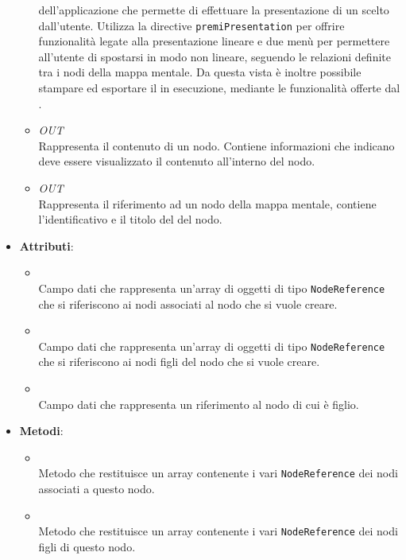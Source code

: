 \begin{itemize}
\begin{itemize}
 dell’applicazione che permette di effettuare la presentazione di un  scelto dall’utente. Utilizza la directive \texttt{premiPresentation} per offrire funzionalità legate alla presentazione lineare e due menù per permettere all'utente di spostarsi in modo non lineare, seguendo le relazioni definite tra i nodi della mappa mentale.
Da questa vista è inoltre possibile stampare ed esportare il  in esecuzione, mediante le funzionalità offerte dal .
\item \textit{OUT} \hyperref[\nogloxy{Premi::Front-End::Model::NodeContent}]{}\\
Rappresenta il contenuto di un nodo. Contiene informazioni che indicano deve essere visualizzato il contenuto all’interno del nodo.
\item \textit{OUT} \hyperref[\nogloxy{Premi::Front-End::Model::NodeReference}]{}\\
Rappresenta il riferimento ad un nodo della mappa mentale, contiene l'identificativo e il titolo del del nodo.
\end{itemize}
\item \textbf{Attributi}:
\begin{itemize}
\item {}
\\ Campo dati che rappresenta un'array di oggetti di tipo \texttt{NodeReference} che si riferiscono ai nodi associati al nodo che si vuole creare.
\item {}
\\ Campo dati che rappresenta un'array di oggetti di tipo \texttt{NodeReference} che si riferiscono ai nodi figli del nodo che si vuole creare.
\item {}
\\ Campo dati che rappresenta un riferimento al nodo di cui è figlio.
\end{itemize}
\item \textbf{Metodi}:
\begin{itemize}
\item {}
\\ Metodo che restituisce un array contenente i vari \texttt{NodeReference} dei nodi associati a questo nodo.
\item {}
\\ Metodo che restituisce un array contenente i vari \texttt{NodeReference} dei nodi figli di questo nodo.

\end{itemize}
\end{itemize}
